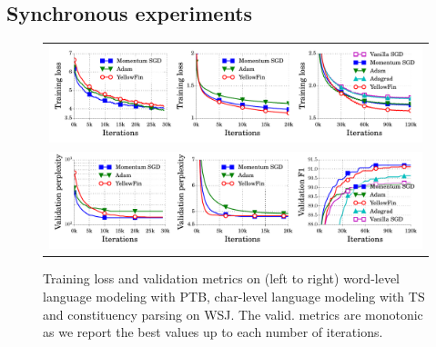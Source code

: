 \subsection{Synchronous experiments}
\label{subsec:sync_exp}
\begin{figure}[t]
\vspace{-0.75em}
\centering
	\begin{tabular}{c}
		\includegraphics[width=0.925\linewidth]{experiment_results/lstm_loss_all.pdf} \\[-0.5em]
		\includegraphics[width=0.925\linewidth]{experiment_results/lstm_test_all.pdf} \\[-0.5em]
	\end{tabular}
	\caption{
	Training loss and validation metrics on (left to right) word-level language modeling with PTB, char-level language modeling with TS and constituency parsing on WSJ. The valid. metrics are monotonic as we report the best values up to each number of iterations.}
	\label{fig:loss_result_ptb}
\end{figure}


